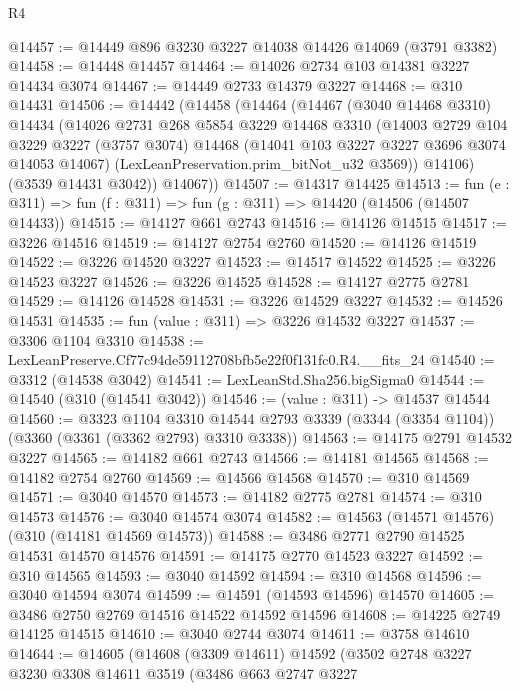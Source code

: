 \begin{lexlean}{R4}
\begin{coremodule}
@14457 := @14449 @896 @3230 @3227 @14038 @14426 @14069 (@3791 @3382)
@14458 := @14448 @14457
@14464 := @14026 @2734 @103 @14381 @3227 @14434 @3074
@14467 := @14449 @2733 @14379 @3227
@14468 := @310 @14431
@14506 := @14442
    (@14458
      (@14464
        (@14467
          (@3040 @14468 @3310)
          @14434
          (@14026
            @2731
            @268
            @5854
            @3229
            @14468
            @3310
            (@14003
              @2729
              @104
              @3229
              @3227
              (@3757 @3074)
              @14468
              (@14041 @103 @3227 @3227 @3696 @3074 @14053 @14067)
              (LexLeanPreservation.prim_bitNot_u32 @3569))
            @14106)
          (@3539 @14431 @3042))
        @14067))
@14507 := @14317 @14425
@14513 := fun (e : @311) => fun (f : @311) => fun (g : @311) => @14420 (@14506 (@14507 @14433))
@14515 := @14127 @661 @2743
@14516 := @14126 @14515
@14517 := @3226 @14516
@14519 := @14127 @2754 @2760
@14520 := @14126 @14519
@14522 := @3226 @14520 @3227
@14523 := @14517 @14522
@14525 := @3226 @14523 @3227
@14526 := @3226 @14525
@14528 := @14127 @2775 @2781
@14529 := @14126 @14528
@14531 := @3226 @14529 @3227
@14532 := @14526 @14531
@14535 := fun (value : @311) => @3226 @14532 @3227
@14537 := @3306 @1104 @3310
@14538 := LexLeanPreserve.Cf77c94de59112708bfb5e22f0f131fc0.R4.__fits_24
@14540 := @3312 (@14538 @3042)
@14541 := LexLeanStd.Sha256.bigSigma0
@14544 := @14540 (@310 (@14541 @3042))
@14546 := (value : @311) -> @14537 @14544
@14560 := @3323
    @1104
    @3310
    @14544
    @2793
    @3339
    (@3344 (@3354 @1104))
    (@3360 (@3361 (@3362 @2793) @3310 @3338))
@14563 := @14175 @2791 @14532 @3227
@14565 := @14182 @661 @2743
@14566 := @14181 @14565
@14568 := @14182 @2754 @2760
@14569 := @14566 @14568
@14570 := @310 @14569
@14571 := @3040 @14570
@14573 := @14182 @2775 @2781
@14574 := @310 @14573
@14576 := @3040 @14574 @3074
@14582 := @14563 (@14571 @14576) (@310 (@14181 @14569 @14573))
@14588 := @3486 @2771 @2790 @14525 @14531 @14570 @14576
@14591 := @14175 @2770 @14523 @3227
@14592 := @310 @14565
@14593 := @3040 @14592
@14594 := @310 @14568
@14596 := @3040 @14594 @3074
@14599 := @14591 (@14593 @14596) @14570
@14605 := @3486 @2750 @2769 @14516 @14522 @14592 @14596
@14608 := @14225 @2749 @14125 @14515
@14610 := @3040 @2744 @3074
@14611 := @3758 @14610
@14644 := @14605
    (@14608
      (@3309 @14611)
      @14592
      (@3502
        @2748
        @3227
        @3230
        @3308
        @14611
        @3519
        (@3486
          @663
          @2747
          @3227

\end{coremodule}
\end{lexlean}
